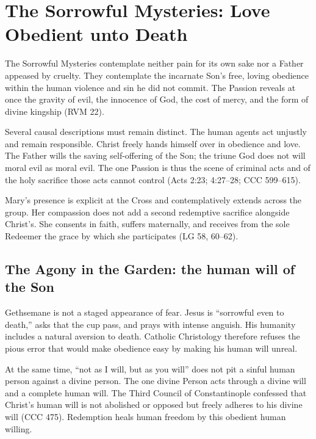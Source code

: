 \section{The Sorrowful Mysteries: Love Obedient unto Death}

The Sorrowful Mysteries contemplate neither pain for its own sake nor a Father appeased by cruelty. They contemplate the incarnate Son's free, loving obedience within the human violence and sin he did not commit. The Passion reveals at once the gravity of evil, the innocence of God, the cost of mercy, and the form of divine kingship (RVM 22).

Several causal descriptions must remain distinct. The human agents act unjustly and remain responsible. Christ freely hands himself over in obedience and love. The Father wills the saving self-offering of the Son; the triune God does not will moral evil as moral evil. The one Passion is thus the scene of criminal acts and of the holy sacrifice those acts cannot control (Acts 2:23; 4:27--28; CCC 599--615).

Mary's presence is explicit at the Cross and contemplatively extends across the group. Her compassion does not add a second redemptive sacrifice alongside Christ's. She consents in faith, suffers maternally, and receives from the sole Redeemer the grace by which she participates (LG 58, 60--62).

\subsection{The Agony in the Garden: the human will of the Son}


Gethsemane is not a staged appearance of fear. Jesus is ``sorrowful even to death,'' asks that the cup pass, and prays with intense anguish. His humanity includes a natural aversion to death. Catholic Christology therefore refuses the pious error that would make obedience easy by making his human will unreal.

At the same time, ``not as I will, but as you will'' does not pit a sinful human person against a divine person. The one divine Person acts through a divine will and a complete human will. The Third Council of Constantinople confessed that Christ's human will is not abolished or opposed but freely adheres to his divine will (CCC 475). Redemption heals human freedom by this obedient human willing.

